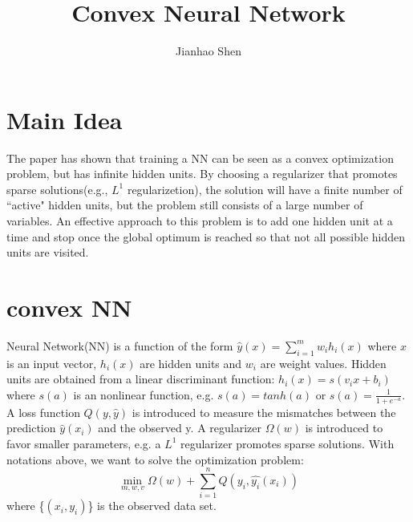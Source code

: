 \documentclass{article}
\title{Convex Neural Network}
\author{Jianhao Shen}
\begin{document}
\maketitle
\section{Main Idea}
The paper has shown that training a NN can be seen as a convex optimization problem, but has infinite hidden units. By choosing a regularizer that promotes sparse solutions(e.g., $L^{1}$ regularizetion),
 the solution will have a finite number of ``active" hidden units, but the problem still consists of a large number of variables. An effective approach to this problem is to add one hidden unit at a time and stop once the global optimum is reached so that not all possible hidden units are visited.
\section{convex NN}
Neural Network(NN) is a function of the form $\hat{y}(x) = \sum_{i=1}^{m} w_{i} h_{i}(x)$ where $x$ is an input vector, $h_{i}(x)$ are hidden units and $w_{i}$ are weight values. Hidden units are obtained from a linear discriminant function: $h_{i}(x) = s(v_{i}x+b_{i})$ where $s(a)$ is an nonlinear function, e.g. $s(a) = tanh(a)$ or $s(a) = \frac{1}{1+e^{-a}}$. A loss function $Q(y,\hat{y})$ is introduced to measure the mismatches between the prediction $\hat{y}(x_{i})$ and the observed y. A regularizer $\Omega(w)$ is introduced to favor smaller parameters, e.g. a $L^{1}$ regularizer promotes sparse solutions. With notations above, we want to solve the optimization problem:
\begin{equation}
\min_{m,w,v} \Omega(w) + \sum_{i=1}^{n}Q(y_{i},\hat{y_{i}}(x_{i})) 
\end{equation}
where \{$(x_{i},y_{i})$\} is the observed data set. 
\end{document}
